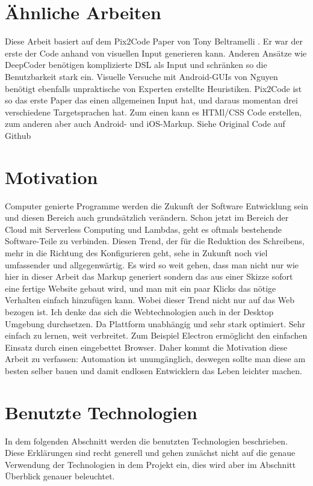 \documentclass[pdftex,a4paper,halfparskip]{scrartcl}
\begin{document}
\section{Ähnliche Arbeiten}

Diese Arbeit basiert auf dem Pix2Code Paper von Tony Beltramelli \cite{Beltramelli17} . Er war der erste der Code anhand von visuellen Input generieren kann. 
Anderen Ansätze wie DeepCoder \cite{DeepCoder16} benötigen komplizierte DSL als Input und schränken so die Benutzbarkeit stark ein. Visuelle Versuche mit Android-GUIs von Nguyen \cite{Nguyen15} benötigt ebenfalls unpraktische von Experten erstellte Heuristiken. Pix2Code ist so das erste Paper das einen allgemeinen Input hat, und daraus momentan drei verschiedene Targetsprachen hat. Zum einen kann es HTMl/CSS Code erstellen, zum anderen aber auch Android- und iOS-Markup. Siehe Original Code auf Github \cite{Beltramelli17Github}


\section{Motivation}
Computer genierte Programme werden die Zukunft der Software Entwicklung sein und diesen Bereich auch grundsätzlich verändern. Schon jetzt im Bereich der Cloud mit Serverless Computing und Lambdas, geht es oftmals bestehende Software-Teile zu verbinden. Diesen Trend, der für die Reduktion des Schreibens, mehr in die Richtung des Konfigurieren geht, sehe in Zukunft noch viel umfassender und allgegenwärtig. Es wird so weit gehen, dass man nicht nur wie hier in dieser Arbeit das Markup generiert sondern das aus einer Skizze sofort eine fertige Website gebaut wird, und man mit ein paar Klicks das nötige Verhalten einfach hinzufügen kann. 
Wobei dieser Trend nicht nur auf das Web bezogen ist. Ich denke das sich die Webtechnologien auch in der Desktop Umgebung durchsetzen.  Da Plattform unabhängig und sehr stark optimiert. Sehr einfach zu lernen, weit verbreitet. Zum Beispiel Electron \cite{electron} ermöglicht den einfachen Einsatz durch einen eingebettet Browser.
Daher kommt die Motivation diese Arbeit zu verfassen: Automation ist unumgänglich, deswegen sollte man diese am besten selber bauen und damit endlosen Entwicklern das Leben leichter machen.

\section{Benutzte Technologien}

In dem folgenden Abschnitt werden die benutzten Technologien beschrieben. Diese Erklärungen sind recht generell und gehen zunächst nicht auf die genaue Verwendung der Technologien in dem Projekt ein, dies wird aber im Abschnitt Überblick genauer beleuchtet.
\end{document}
